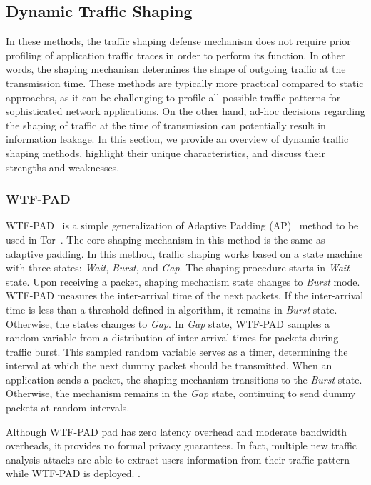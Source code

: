 \subsection{Dynamic Traffic Shaping}\label{subsec:dynamic-traffic-shaping}
In these methods, the traffic shaping defense mechanism does not require prior profiling of application traffic traces in order to perform its function.  
In other words, the shaping mechanism determines the shape of outgoing traffic at the transmission time.
These methods are typically more practical compared to static approaches, as it can be challenging to profile all possible traffic patterns for sophisticated network applications.
On the other hand, ad-hoc decisions regarding the shaping of traffic at the time of transmission can potentially result in information leakage.
In this section, we provide an overview of dynamic traffic shaping methods, highlight their unique characteristics, and discuss their strengths and weaknesses.

\subsubsection{WTF-PAD}\label{subsubsec:wtf-pad}
WTF-PAD~\cite{juarez2016toward} is a simple generalization of Adaptive Padding (AP)~\cite{shmatikov2006timing} method to be used in Tor~\cite{dingledine2004tor}. 
The core shaping mechanism in this method is the same as adaptive padding. 
In this method, traffic shaping works based on a state machine with three states: \textit{Wait}, \textit{Burst}, and \textit{Gap}. 
The shaping procedure starts in \textit{Wait} state. 
Upon receiving a packet, shaping mechanism state changes to \textit{Burst} mode. 
WTF-PAD measures the inter-arrival time of the next packets. 
If the inter-arrival time is less than a threshold defined in algorithm, it remains in \textit{Burst} state. Otherwise, the states changes to \textit{Gap}.
In \textit{Gap} state, WTF-PAD samples a random variable from a distribution of inter-arrival times for packets during traffic burst.
This sampled random variable serves as a timer, determining the interval at which the next dummy packet should be transmitted.
When an application sends a packet, the shaping mechanism transitions to the \textit{Burst} state. Otherwise, the mechanism remains in the \textit{Gap} state, continuing to send dummy packets at random intervals. 

Although WTF-PAD pad has zero latency overhead and moderate bandwidth overheads, it provides no formal privacy guarantees.
In fact, multiple new traffic analysis attacks are able to extract users information from their traffic pattern while WTF-PAD is deployed.
.


